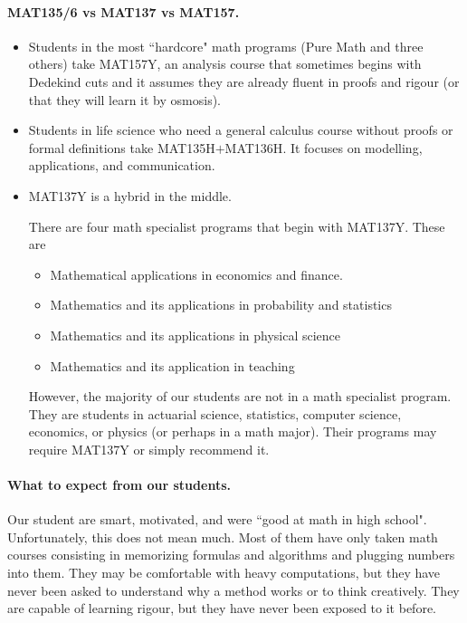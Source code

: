 \documentclass[11pt]{article}
\begin{document}
	\paragraph{MAT135/6 vs MAT137 vs MAT157.}
	\begin{itemize}
		\item Students in the most ``hardcore" math programs (Pure Math and three others)
			take \textcolor{137cp1}{MAT157Y}, an analysis course that sometimes begins
			with Dedekind cuts and it assumes they are already fluent in proofs and
			rigour (or that they will learn it by osmosis).

		\item Students in life science who need a general calculus course without proofs
			or formal definitions take \textcolor{137cp1}{MAT135H$+$MAT136H}. It focuses
			on modelling, applications, and communication.

		\item \textcolor{137cp1}{MAT137Y} is a hybrid in the middle.

			There are four math specialist programs that begin with MAT137Y. These are
			\begin{itemize}
				\item Mathematical applications in economics and finance.

				\item Mathematics and its applications in probability and statistics

				\item Mathematics and its applications in physical science

				\item Mathematics and its application in teaching
			\end{itemize}
			However, the majority of our students are not in a math specialist program.
			They are students in actuarial science, statistics, computer science,
			economics, or physics (or perhaps in a math major). Their programs may
			require MAT137Y or simply recommend it.
	\end{itemize}

	\paragraph{What to expect from our students.}
	Our student are smart, motivated, and were ``good at math in high school". Unfortunately,
	this does not mean much. Most of them have only taken math courses consisting in
	memorizing formulas and algorithms and plugging numbers into them. They may be
	comfortable with heavy computations, but they have never been asked to understand
	why a method works or to think creatively. They are capable of learning rigour,
	but they have never been exposed to it before.
\end{document}
